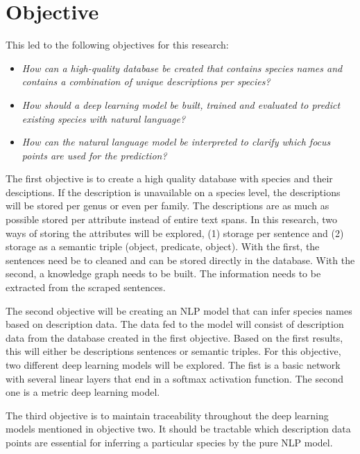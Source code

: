\documentclass{article}
\begin{document}
\section{Objective}
This led to the following objectives for this research:
\noindent 
\begin{itemize}
    
    \item \emph{How can a high-quality database be created that contains species names and contains a combination of unique descriptions per species?}
    
    \item \emph{How should a deep learning model be built, trained and evaluated to predict existing species with natural language?}

    \item \emph{How can the natural language model be interpreted to clarify which focus points are used for the prediction?}

\end{itemize}

The first objective is to create a high quality database with species and their desciptions.
If the description is unavailable on a species level, the descriptions will be stored per genus or even per family.
The descriptions are as much as possible stored per attribute instead of entire text spans.
In this research, two ways of storing the attributes will be explored, (1) storage per sentence and (2) storage as a semantic triple (object, predicate, object).
With the first, the sentences need be to cleaned and can be stored directly in the database.
With the second, a knowledge graph needs to be built.
The information needs to be extracted from the scraped sentences.

The second objective will be creating an NLP model that can infer species names based on description data. 
The data fed to the model will consist of description data from the database created in the first objective. 
Based on the first results, this will either be descriptions sentences or semantic triples.
For this objective, two different deep learning models will be explored.
The fist is a basic network with several linear layers that end in a softmax activation function.
The second one is a metric deep learning model.

The third objective is to maintain traceability throughout the deep learning models mentioned in objective two.
It should be tractable which description data points are essential for inferring a particular species by the pure NLP model.
\end{document}
